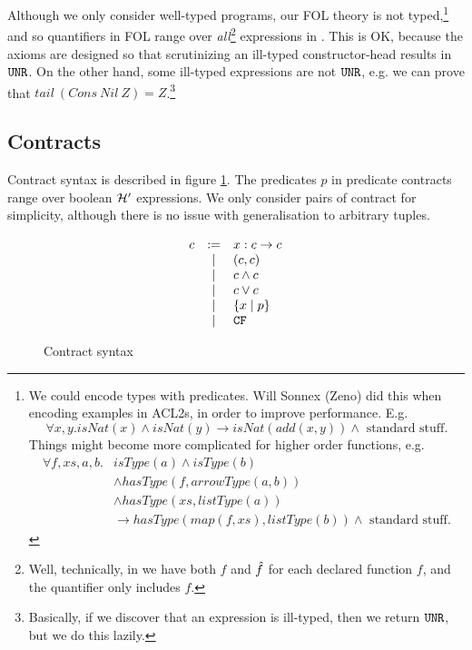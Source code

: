 \documentclass[preprint]{sigplanconf}
\begin{document}
Although we only consider well-typed programs, 
our FOL theory is not typed,\footnote{
%
  We could encode types with predicates.  Will Sonnex (Zeno) did this 
  when encoding examples in ACL2s, in order to improve performance.  E.g.
  \[
  \forall x,y. isNat(x) \land isNat(y) \to isNat(add(x,y)) \land \text{ standard stuff}.
  \]
  Things might become more complicated for higher order functions, e.g.
  \begin{align*}
  \forall f,xs,a,b.& isType(a) \land isType(b) \\
                   &\land hasType(f,arrowType(a,b)) \\
                   &\land hasType(xs,listType(a))\\
                   &\to hasType(map(f,xs),listType(b)) \land \text{ standard stuff}.
  \end{align*}
%
}
and so quantifiers in FOL range over \emph{all}\footnote{
%
  Well, technically, in \hprime we have both $f$ and $\hat{f}$ for
  each declared function $f$, and the quantifier only includes $f$.
%
} expressions in \hprime.
This is OK, because the axioms are designed so that scrutinizing an
ill-typed constructor-head results in $\texttt{UNR}$.  On the other hand,
some ill-typed expressions are not $\texttt{UNR}$, e.g. we can prove
that $tail~(Cons~Nil~Z) = Z$.\footnote{
%
  Basically, if we discover that an expression is ill-typed, then we return $\texttt{UNR}$, but
  we do this lazily.
%
}


\subsection{Contracts}
Contract syntax is described in figure \ref{cont-stx}. The predicates
$p$ in predicate contracts range over boolean $\mathcal{H}'$ expressions. We
only consider pairs of contract for simplicity, although there is no
issue with generalisation to arbitrary tuples.

\begin{figure}[h]
 \centering 
  \[  \begin{array}{rclr}
  c &:=& x:c \to c\\
  &\mid& (c,c) \\
  &\mid& c \land c \\
  &\mid& c \lor c \\
  &\mid& \{ x \mid p \}\\
  &\mid& \texttt{CF} \\
  \end{array} \]
  \caption{Contract syntax}
  \label{cont-stx}
\end{figure}
\end{document}
